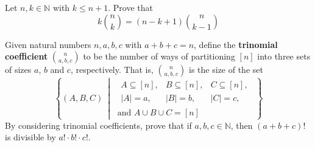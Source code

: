 \begin{exercise}
\label{exCountingKTimesNChooseK}
Let $n,k \in \mathbb{N}$ with $k \le n+1$. Prove that
\[ k \binom{n}{k} = (n-k+1) \binom{n}{k-1} \]
\end{exercise}


\begin{exercise}
\label{exTrinomialCoefficients}
Given natural numbers $n,a,b,c$ with $a+b+c=n$, define the \textbf{trinomial coefficient} $\displaystyle \binom{n}{a,b,c}$  to be the number of ways of partitioning $[n]$ into three sets of sizes $a$, $b$ and $c$, respectively. That is, $\displaystyle \binom{n}{a,b,c}$ is the size of the set
\[ \left\{ (A,B,C)\ \middle|\ 
\begin{matrix} \begin{matrix} A \subseteq [n], & B \subseteq [n], & C \subseteq[n], \\ |A|=a, & |B|=b, & |C|=c, \end{matrix} \\ \text{and } A \cup B \cup C = [n] \end{matrix} \right\} \]
By considering trinomial coefficients, prove that if $a,b,c \in \mathbb{N}$, then $(a+b+c)!$ is divisible by $a! \cdot b! \cdot c!$.
\end{exercise}

